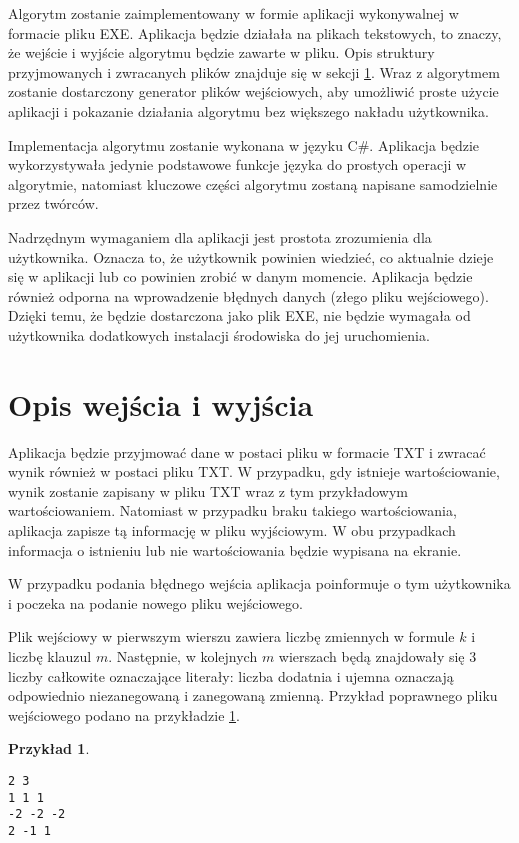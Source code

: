 \documentclass[a4paper,10pt,twoside]{report}
\theoremstyle{definition}
\newtheorem{example}[theorem]{Przykład}
\begin{document}
Algorytm zostanie zaimplementowany w formie aplikacji wykonywalnej w formacie pliku EXE. Aplikacja będzie działała na plikach tekstowych, to znaczy, że wejście i wyjście algorytmu będzie zawarte w pliku. Opis struktury przyjmowanych i zwracanych plików znajduje się w sekcji \ref{opis_plikow}. Wraz z algorytmem zostanie dostarczony generator plików wejściowych, aby umożliwić proste użycie aplikacji i pokazanie działania algorytmu bez większego nakładu użytkownika.

Implementacja algorytmu zostanie wykonana w języku C\#. Aplikacja będzie wykorzystywała jedynie podstawowe funkcje języka do prostych operacji w algorytmie, natomiast kluczowe części algorytmu zostaną napisane samodzielnie przez twórców.

Nadrzędnym wymaganiem dla aplikacji jest prostota zrozumienia dla użytkownika. Oznacza to, że użytkownik powinien wiedzieć, co aktualnie dzieje się w aplikacji lub co powinien zrobić w danym momencie. Aplikacja będzie również odporna na wprowadzenie błędnych danych (złego pliku wejściowego). Dzięki temu, że będzie dostarczona jako plik EXE, nie będzie wymagała od użytkownika dodatkowych instalacji środowiska do jej uruchomienia.

\section{Opis wejścia i wyjścia}\label{opis_plikow}

Aplikacja będzie przyjmować dane w postaci pliku w formacie TXT i zwracać wynik również w postaci pliku TXT. W przypadku, gdy istnieje wartościowanie, wynik zostanie zapisany w pliku TXT wraz z tym przykładowym wartościowaniem. Natomiast w przypadku braku takiego wartościowania, aplikacja zapisze tą informację w pliku wyjściowym. W obu przypadkach informacja o istnieniu lub nie wartościowania będzie wypisana na ekranie.

W przypadku podania błędnego wejścia aplikacja poinformuje o tym użytkownika i poczeka na podanie nowego pliku wejściowego.

Plik wejściowy w pierwszym wierszu zawiera liczbę zmiennych w formule $k$ i liczbę klauzul $m$. Następnie, w kolejnych $m$ wierszach będą znajdowały się 3 liczby całkowite oznaczające literały: liczba dodatnia i ujemna oznaczają odpowiednio niezanegowaną i zanegowaną zmienną. Przykład poprawnego pliku wejściowego podano na przykładzie \ref{exp:przyklad_wejscia}.

\begin{example} \hfill

\begin{verbatim}
2 3
1 1 1
-2 -2 -2
2 -1 1
\end{verbatim}

\label{exp:przyklad_wejscia}
\end{example}
\end{document}
